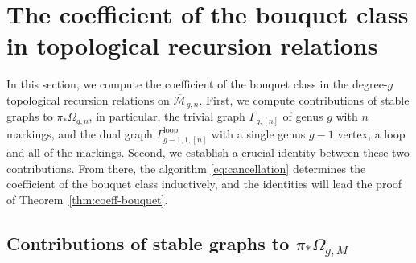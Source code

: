 \documentclass[12pt,reqno]{amsart}
\newcommand{\Gammaloop}{\Gamma^\mathrm{loop}}
\theoremstyle{plain}
\newtheorem{proposition}[theorem]{Proposition}
\newtheorem{conjecture}[theorem]{Conjecture}
\theoremstyle{definition}
\theoremstyle{remark}
\begin{document}
 



\section{The coefficient of the bouquet class in topological recursion relations}
\label{sec:coeff-bou}

In this section, we compute the coefficient of the bouquet class in the degree-$g$ topological recursion relations on $\overline{\mathcal{M}}_{g,n}$.
First, we compute contributions of stable graphs to $\pi_{*}\Omega_{g,n}$, in particular, the trivial graph $\Gamma_{g,[n]}$ of genus $g$ with $n$ markings, and the dual graph $\Gammaloop_{g-1, 1, [n]}$ with a single genus $g-1$ vertex, a loop and all of the markings.
Second, we establish a crucial identity between these two contributions.
From there, the algorithm  \eqref{eq:cancellation} determines the coefficient of the bouquet class inductively, and the identities will lead the proof of Theorem~\ref{thm:coeff-bouquet}.

\subsection{Contributions of stable graphs to $\pi_* \Omega_{g, M}$}
\end{document}
